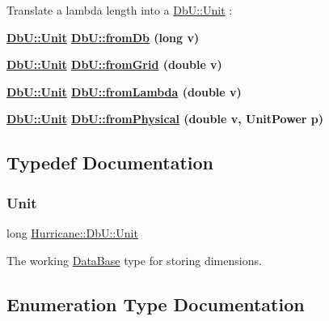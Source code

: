 Translate a lambda length into a \mbox{\hyperlink{group__DbUGroup_ga4fbfa3e8c89347af76c9628ea06c4146}{Db\+U\+::\+Unit}} \+: 
\begin{DoxyItemize}
\item {\bfseries \mbox{\hyperlink{group__DbUGroup_ga4fbfa3e8c89347af76c9628ea06c4146}{Db\+U\+::\+Unit}} \mbox{\hyperlink{group__DbUGroup_gaec69d65ec1651c2feea24c5931f4580b}{Db\+U\+::from\+Db}} (long v)} 
\item {\bfseries \mbox{\hyperlink{group__DbUGroup_ga4fbfa3e8c89347af76c9628ea06c4146}{Db\+U\+::\+Unit}} \mbox{\hyperlink{group__DbUGroup_ga367e1d1b5ac1df076745550cba8a83c1}{Db\+U\+::from\+Grid}} (double v)} 
\item {\bfseries \mbox{\hyperlink{group__DbUGroup_ga4fbfa3e8c89347af76c9628ea06c4146}{Db\+U\+::\+Unit}} \mbox{\hyperlink{group__DbUGroup_ga4b570755b19ea9ff0f2f258a221bd935}{Db\+U\+::from\+Lambda}} (double v)} 
\item {\bfseries \mbox{\hyperlink{group__DbUGroup_ga4fbfa3e8c89347af76c9628ea06c4146}{Db\+U\+::\+Unit}} \mbox{\hyperlink{group__DbUGroup_ga11d4dbd9134a19bda35cbacde1cb2769}{Db\+U\+::from\+Physical}} (double v, Unit\+Power p)} 
\end{DoxyItemize}

\subsection{Typedef Documentation}
\mbox{\label{group__DbUGroup_ga4fbfa3e8c89347af76c9628ea06c4146}} 
\subsubsection{\texorpdfstring{Unit}{Unit}}
{\footnotesize\ttfamily long \mbox{\hyperlink{group__DbUGroup_ga4fbfa3e8c89347af76c9628ea06c4146}{Hurricane\+::\+Db\+U\+::\+Unit}}}

The working \mbox{\hyperlink{classHurricane_1_1DataBase}{Data\+Base}} type for storing dimensions. 

\subsection{Enumeration Type Documentation}
\mbox{\label{group__DbUGroup_ga6af6a5b8d113a661fea65b2bcb8b25c4}} 
